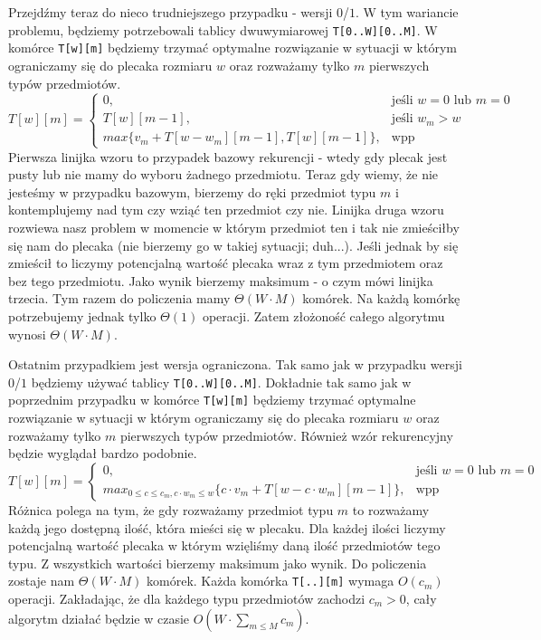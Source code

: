 Przejdźmy teraz do nieco trudniejszego przypadku - wersji $0$/$1$.
W tym wariancie problemu, będziemy potrzebowali tablicy dwuwymiarowej \texttt{T[0..W][0..M]}.
W komórce \texttt{T[w][m]} będziemy trzymać optymalne rozwiązanie w sytuacji w którym ograniczamy się do plecaka rozmiaru $w$ oraz rozważamy tylko $m$ pierwszych typów przedmiotów.
\begin{equation*}
  T[w][m] = \begin{cases}
    0, & \text{jeśli $w = 0$ lub $m = 0$}\\
    T[w][m-1], & \text{jeśli $w_m > w$}\\
    max\{v_m + T[w - w_m][m-1], T[w][m-1]\}, & \text{wpp}
  \end{cases}
\end{equation*}
Pierwsza linijka wzoru to przypadek bazowy rekurencji - wtedy gdy plecak jest pusty lub nie mamy do wyboru żadnego przedmiotu.
Teraz gdy wiemy, że nie jesteśmy w przypadku bazowym, bierzemy do ręki przedmiot typu $m$ i kontemplujemy nad tym czy wziąć ten przedmiot czy nie.
Linijka druga wzoru rozwiewa nasz problem w momencie w którym przedmiot ten i tak nie zmieściłby się nam do plecaka (nie bierzemy go w takiej sytuacji; duh...).
Jeśli jednak by się zmieścił to liczymy potencjalną wartość plecaka wraz z tym przedmiotem oraz bez tego przedmiotu.
Jako wynik bierzemy maksimum - o czym mówi linijka trzecia.
Tym razem do policzenia mamy $\Theta(W \cdot M)$ komórek.
Na każdą komórkę potrzebujemy jednak tylko $\Theta(1)$ operacji.
Zatem złożoność całego algorytmu wynosi $\Theta(W \cdot M)$.

Ostatnim przypadkiem jest wersja ograniczona.
Tak samo jak w przypadku wersji $0$/$1$ będziemy używać tablicy \texttt{T[0..W][0..M]}.
Dokładnie tak samo jak w poprzednim przypadku w komórce \texttt{T[w][m]} będziemy trzymać optymalne rozwiązanie
w sytuacji w którym ograniczamy się do plecaka rozmiaru $w$ oraz rozważamy tylko $m$ pierwszych typów przedmiotów.
Również wzór rekurencyjny będzie wyglądał bardzo podobnie.
\begin{equation*}
  T[w][m] = \begin{cases}
    0, & \text{jeśli $w = 0$ lub $m = 0$}\\
    max_{0 \leq c \leq c_m, c \cdot w_m \leq w}\{c \cdot v_m + T[w - c \cdot w_m][m-1]\}, & \text{wpp}
  \end{cases}
\end{equation*}
Różnica polega na tym, że gdy rozważamy przedmiot typu $m$ to rozważamy każdą jego dostępną ilość, która mieści się w plecaku.
Dla każdej ilości liczymy potencjalną wartość plecaka w którym wzięliśmy daną ilość przedmiotów tego typu.
Z wszystkich wartości bierzemy maksimum jako wynik.
Do policzenia zostaje nam $\Theta(W \cdot M)$ komórek.
Każda komórka \texttt{T[..][m]} wymaga $O(c_m)$ operacji.
Zakładając, że dla każdego typu przedmiotów zachodzi $c_m > 0$, cały algorytm działać będzie w czasie $O(W \cdot \sum_{m \leq M} c_m)$.

